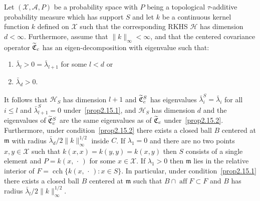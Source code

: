\documentclass[10pt]{amsart}
\theoremstyle{definition}\newtheorem{defi}[theo]{Definition}\newtheorem{rema}[theo]{Remark}\newtheorem{exam}[theo]{Example}\newtheorem{exem}[theo]{Example}\newtheorem{nota}[theo]{Notation}
\theoremstyle{remark}
\DeclareMathOperator{\cch}{cch}
\DeclareMathOperator{\aff}{aff}
\newcommand{\X}{\mathcal{X}}
\newcommand{\clA}{\mathcal{A}}
\newcommand{\cH}{\mathcal{H}}
\newcommand{\fkC}{\mathfrak{C}}
\newcommand{\mean}{\mathfrak{m}}
\newcommand*{\relabel}{\renewcommand{\labelenumi}{(\theenumi)}}
\newcommand*{\romanenumi}{\renewcommand*{\theenumi}{\roman{enumi}}\relabel}
\let\oldtilde\tilde
\renewcommand*{\tilde}[1]{\mathchoice{\widetilde{#1}}{\widetilde{#1}}{\oldtilde{#1}}{\oldtilde{#1}}}
\begin{document}
\begin{prop}\label{prop:data_dep_ball}
Let $(\X,\clA,P)$ be a probability space with $P$ being a topological $\tau$-additive probability measure which has support $S$ and let $k$ be a continuous kernel function $k$ defined on $\X$ such that the corresponding RKHS $\cH$ has dimension $d<\infty$. Furthermore, assume that $\|k\|_\infty < \infty$, and that the centered covariance operator $\tilde{\fkC}_c$ has an eigen-decomposition with eigenvalue such that:
\begin{enumerate}\romanenumi
\item\label{prop2.15.1} $\bar \lambda_{l} > 0 = \bar \lambda_{l+1}$ for some $l< d$ or 
\item\label{prop2.15.2} $ \bar \lambda_d > 0$.
\end{enumerate}
It follows that $\cH_S$ has dimension $l+1$ and $\tilde{\fkC}^S_c$ has eigenvalues $\bar \lambda^S_i = \bar \lambda_i$ for all $i\leq l$ and $\bar\lambda_{l+1}^S = 0$ under~\eqref{prop2.15.1}, and $\cH_S$ has dimension $d$ and the eigenvalues of $\tilde{\fkC}^S_c$ are the same eigenvalues as of $\tilde{\fkC}_c$ under~\eqref{prop2.15.2}. Furthermore, under condition~\eqref{prop2.15.2} there exists a closed ball $B$ centered at $\mean$ with radius $\bar \lambda_d/2 \|k\|_\infty^{1/2}$ inside $C$. If $\lambda_1 = 0$ and there are no two points $x,y \in \X$ such that $k(x,x) = k(y,y) =k(x,y)$ then $S$ consists of a single element and $P = k(x,\,\cdot\,)$ for some $x\in \X$. If $\lambda_1 > 0$ then $\mean$ lies in the relative interior of $F = \cch\{k(x,\,\cdot\,) : x \in S \}$. In particular, under condition~\eqref{prop2.15.1} there exists a closed ball $B$ centered at $\mean$ such that $B\cap \aff F \subset F$ and $B$ has radius $\bar \lambda_l / 2 \|k\|_\infty^{1/2}$.
\end{prop}
\goodbreak
\end{document}
